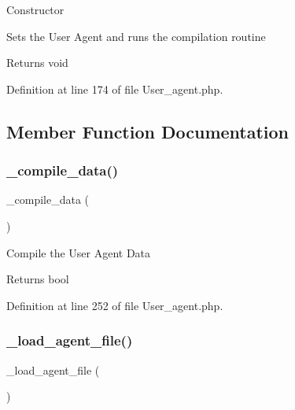 Constructor

Sets the User Agent and runs the compilation routine

\begin{DoxyReturn}{Returns}
void 
\end{DoxyReturn}


Definition at line 174 of file User\+\_\+agent.\+php.



\subsection{Member Function Documentation}
\mbox{\label{class_c_i___user__agent_a4ced3acbcc2ab5e599f212c676590d06}} 
\subsubsection{\texorpdfstring{\_compile\_data()}{\_compile\_data()}}
{\footnotesize\ttfamily \+\_\+compile\+\_\+data (\begin{DoxyParamCaption}{ }\end{DoxyParamCaption})\hspace{0.3cm}{\ttfamily [protected]}}

Compile the User Agent Data

\begin{DoxyReturn}{Returns}
bool 
\end{DoxyReturn}


Definition at line 252 of file User\+\_\+agent.\+php.

\mbox{\label{class_c_i___user__agent_a96ec01490c667b47c5faec7cb53c34b2}} 
\subsubsection{\texorpdfstring{\_load\_agent\_file()}{\_load\_agent\_file()}}
{\footnotesize\ttfamily \+\_\+load\+\_\+agent\+\_\+file (\begin{DoxyParamCaption}{ }\end{DoxyParamCaption})\hspace{0.3cm}{\ttfamily [protected]}}


